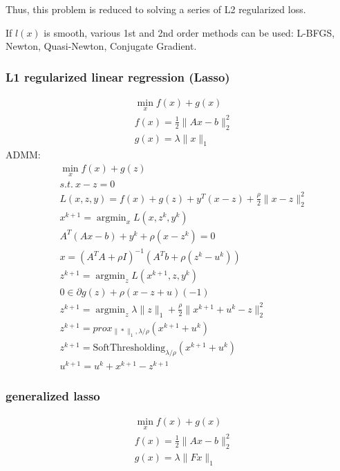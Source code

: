 \documentclass[8pt]{report}
\DeclareMathOperator*{\argmin}{argmin}
\newcommand{\norm}[1]{\|#1\|}
\begin{document}
\begin{multicols*}{2}
  Thus, this problem is reduced to solving a series of L2 regularized loss.

  If $l(x)$ is smooth, various 1st and 2nd order methods can be used: L-BFGS, Newton, Quasi-Newton, Conjugate Gradient.

  \vfill\null
  \columnbreak
  
  \subsubsection{L1 regularized linear regression (Lasso)}
  \begin{align*}
    &\min_x f(x) + g(x)\\
    &f(x) = \frac{1}{2}\norm{Ax-b}_2^2\\
    &g(x)=\lambda\norm{x}_1
  \end{align*}
  ADMM:
  \begin{align*}
    &\min_x f(x) + g(z)\\
    &s.t.\ x-z=0\\
    &L(x,z,y)=f(x) + g(z) + y^T(x-z) + \frac{\rho}{2}\norm{x-z}_2^2\\
    &x^{k+1} = \argmin_x L(x,z^k,y^k)\\
    &A^T(Ax-b) + y^k + \rho (x-z^k)=0\\
    &x = (A^TA+\rho I)^{-1}(A^Tb + \rho (z^k-u^k))\\
    &z^{k+1} = \argmin_z L(x^{k+1},z,y^k)\\
    &0 \in \partial g(z) +\rho(x-z+u)(-1)\\
    &z^{k+1} = \argmin_z \lambda\norm{z}_1 + \frac{\rho}{2}\norm{x^{k+1}+u^k-z}_2^2\\
    &z^{k+1} = prox_{\norm{*}_1, \lambda/\rho}(x^{k+1}+u^k)\\
    &z^{k+1} = \text{SoftThresholding}_{\lambda/\rho}(x^{k+1}+u^k)\\
    &u^{k+1} = u^k+x^{k+1}-z^{k+1}
  \end{align*}  

  \vfill\null
  \columnbreak
  
  \subsubsection{generalized lasso}
  \begin{align*}
    &\min_x f(x) + g(x)\\
    &f(x) = \frac{1}{2}\norm{Ax-b}_2^2\\
    &g(x)=\lambda\norm{Fx}_1
  \end{align*}
  

\end{multicols*}
\end{document}
